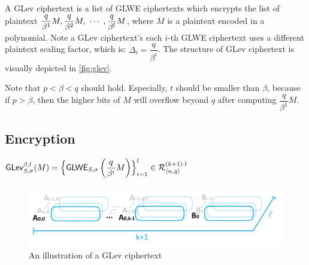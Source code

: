 A GLev ciphertext is a list of GLWE ciphertexts which encrypts the list of plaintext $\dfrac{q}{\beta^1}M, \dfrac{q}{\beta^2}M, \text{ } \text{$\cdots$} \text{ }, \dfrac{q}{\beta^l}M$, where $M$ is a plaintext encoded in a polynomial. Note  a GLev ciphertext's each $i$-th GLWE ciphertext uses a different plaintext scaling factor, which is: $\Delta_i = \dfrac{q}{\beta^i}$. The structure of GLev ciphertext is visually depicted in \autoref{fig:glev}.

Note that $p < \beta < q$ should hold. Especially, $t$ should be smaller than $\beta$, because if $p > \beta$, then the higher bits of $M$ will overflow beyond $q$ after computing $\dfrac{q}{\beta^1}M$. 

\subsection{Encryption}
\label{subsec:glev-enc}

\begin{tcolorbox}[title={\textbf{\tboxlabel{\ref*{subsec:glev-enc}} GLev Encryption}}]


$\textsf{GLev}_{S, \sigma}^{\beta, l}(M) = \Bigl \{\textsf{GLWE}_{S, \sigma}\left(\dfrac{q}{\beta^i} M\right)  \Bigr \}_{i=1}^{l} \in \mathcal{R}_{\langle n, q \rangle }^{(k+1) \cdot l}$
\end{tcolorbox}

\begin{figure}[h!]
    \centering
  \includegraphics[width=1.0\linewidth]{figures/TFHE-fig2.pdf}
  \caption{An illustration of a GLev ciphertext }
  \label{fig:glev}
\end{figure}


